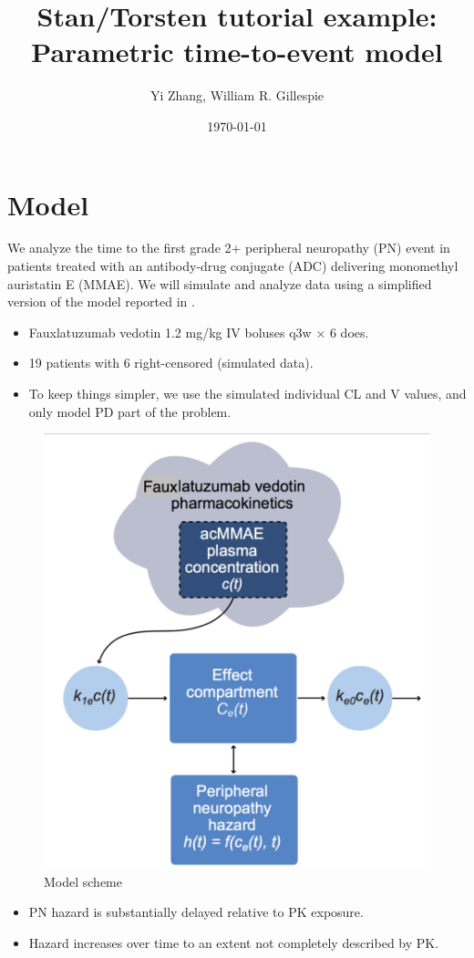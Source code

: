 \documentclass[11pt]{article}
\author{Yi Zhang, William R. Gillespie}
\date{\today}
\title{Stan/Torsten tutorial example: Parametric time-to-event model}
\begin{document}
\maketitle
\section{Model}
\label{sec:org92df8be}
We analyze the time to the first grade 2+ peripheral neuropathy
(PN) event in patients treated with an antibody-drug conjugate (ADC) delivering monomethyl auristatin E
(MMAE). We will simulate and analyze data using a simplified version of the
model reported in \cite{lu_time--event_2017}.
\begin{itemize}
\item Fauxlatuzumab vedotin 1.2 mg/kg IV boluses q3w \(\times\) 6 does.
\item 19 patients with 6 right-censored (simulated data).
\item To keep things simpler, we use the simulated individual CL and V values, and only model PD part of the problem.
\end{itemize}
\begin{figure}[htbp]
\centering
\includegraphics[width=0.4\columnwidth]{./lu2017Model.pdf}
\caption{Model scheme}
\end{figure}
\begin{itemize}
\item PN hazard is substantially delayed relative to PK exposure.
\item Hazard increases over time to an extent not completely described by PK.
\end{itemize}
\end{document}
